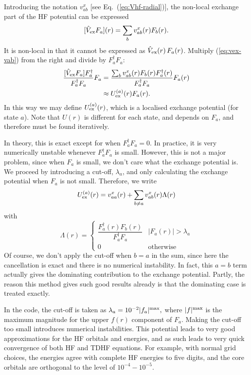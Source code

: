 \documentclass[10pt,twocolumn,a4paper]{article}%
\newcommand{\be}{\begin{equation}}
\newcommand{\ee}{\end{equation}}
\begin{document}
Introducing the notation $v^x_{ab}$ [see Eq.~(\ref{eq:Vhf-radial})], the non-local exchange part of the HF potential can be expressed
\be\label{eq:vex-vab}
 [\hat V_{\rm ex}F_a](r) = \sum_b v^x_{ab}(r) F_b(r).
\ee
It is non-local in that it cannot be expressed as $\hat V_{\rm ex}(r)\,F_a(r)$.
Multiply (\ref{eq:vex-vab}) from the right and divide  by $ F_a^\dag F_a$:
\begin{align}
 \frac{[\hat V_{\rm ex}F_a] F_a^\dag }{F_a^\dag F_a} F_a
&= \frac{\sum_b v^x_{ab}(r) F_b(r)F_a^\dag(r) }{F_a^\dag F_a} F_a(r)\\
&\approx U^{(a)}_{\rm ex}(r)F_a(r).
\end{align}
In this way we may define $U^{(a)}_{\rm ex}(r)$, which is a localised exchange potential (for state $a$).
Note that $U(r)$ is different for each state, and depends on $F_a$, and therefore must be found iteratively.


In theory, this is exact except for when $F_a^\dag F_a=0$.
In practice, it is very numerically unstable whenever $F_a^\dag F_a$ is small.
However, this is not a major problem, since when $F_a$ is small, we don't care what the exchange potential is.
We proceed by introducing a cut-off, $\lambda_a$, and only calculating the exchange potential when $F_a$ is not small.
%
Therefore, we write
\be
 U^{(a)}_{\rm ex}(r) =
v^x_{aa}(r) + \sum_{b\neq a} v^x_{ab}(r) \Lambda(r)
\ee
with
\be
\Lambda(r) =
\begin{cases}\dfrac{F_a^\dag(r) F_b(r)}{F_a^\dag F_a} & |F_a(r)|>\lambda_a\\
0&\mathrm{otherwise}
\end{cases}
\ee
%
Of course, we don't apply the cut-off when $b=a$ in the sum, since here the cancellation is exact and there is no numerical instability.
In fact, this $a=b$ term actually gives the dominating contribution to the exchange potential.
Partly, the reason this method gives such good results already is that the dominating case is treated exactly.

In the code, the cut-off is taken as
$
\lambda_{a} = 10^{-2} |f_a|^{\rm max},
$
where  $|f|^{\rm max}$ is the maximum magnitude for the upper $f(r)$ component of $F_a$.
Making the cut-off too small introduces numerical instabilities.
%
This potential leads to very good approximations for the HF orbitals and energies, and as such leads to very quick convergence of both HF and TDHF equations.
For example, with normal grid choices, the energies agree with complete HF energies to five digits, and the core orbitals are orthogonal to the level of $10^{-4}- 10^{-5}$.
\end{document}
